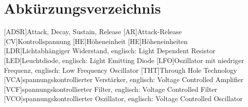 
\chapter{Abkürzungsverzeichnis}

\begin{acronym}
  [ADSR]{Attack, Decay, Sustain, Release}
  [AR]{Attack-Release}
  [CV]{Kontrollspannung}
  [HE]{Höheneinheit}
  [HE]{Höheneinheiten}
  [LDR]{Lichtabhängiger Widerstand, englisch: Light Dependent Resistor}
  [LED]{Leuchtdiode, englisch: Light Emitting Diode}
  [LFO]{Oszillator mit niedriger Frequenz, englisch: Low Frequency Oscillator}
  [THT]{Through Hole Technology}
  [VCA]{spannungskontrollierter Verstärker, englisch: Voltage Controlled Amplifier}
  [VCF]{spannungskontrollierter Filter, englisch: Voltage Controlled Filter}
  [VCO]{spannungskontrollierter Oszillator, englisch: Voltage Controlled Oscillator}
\end{acronym}
